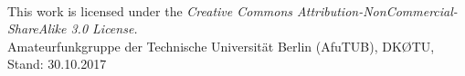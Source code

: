 

\begin{frame}
    \date{} %
    \titlepage
    \vfill
    \begin{center}
        \ccbyncsaeu\\
        {\tiny This work is licensed under the \em{Creative Commons Attribution-NonCommercial-ShareAlike 3.0 License}.}\\[0.5ex]
         \tiny Amateurfunkgruppe der Technische Universität Berlin (AfuTUB), DKØTU, Stand: 30.10.2017
    \end{center}
\end{frame}
